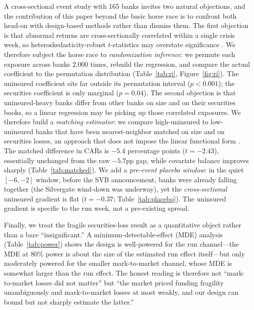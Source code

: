 \documentclass[12pt]{article}
\begin{document}
A cross-sectional event study with 165 banks invites two natural objections, and the
contribution of this paper beyond the basic horse race is to confront both head-on with
design-based methods rather than dismiss them. The first objection is that abnormal returns
are cross-sectionally correlated within a single crisis week, so heteroskedasticity-robust
$t$-statistics may overstate significance \citep{kolari2010,young2019}. We therefore subject
the horse race to \emph{randomization inference}: we permute each exposure across banks
2{,}000 times, rebuild the regression, and compare the actual coefficient to the permutation
distribution (Table~\ref{tab:ri}, Figure~\ref{fig:ri}). The uninsured coefficient sits far
outside its permutation interval ($p<0.001$); the securities coefficient is only marginal
($p=0.04$). The second objection is that uninsured-heavy banks differ from other banks on
size and on their securities books, so a linear regression may be picking up those
correlated exposures. We therefore build a \emph{matching estimator}: we compare
high-uninsured to low-uninsured banks that have been nearest-neighbor matched on size and
on securities losses, an approach that does not impose the linear functional form
\citep{imbens2004}. The matched difference in CARs is $-5.4$ percentage points ($t=-2.43$),
essentially unchanged from the raw $-5.7$pp gap, while covariate balance improves sharply
(Table~\ref{tab:matched}). We add a \emph{pre-event placebo window}: in the quiet
$[-6,-2]$ window, before the SVB announcement, banks were already falling together (the
Silvergate wind-down was underway), yet the \emph{cross-sectional} uninsured gradient is
flat ($t=-0.37$; Table~\ref{tab:placebo}). The uninsured gradient is specific to the run
week, not a pre-existing spread.

Finally, we treat the fragile securities-loss result as a quantitative object rather than a
bare ``insignificant.'' A minimum-detectable-effect (MDE) analysis (Table~\ref{tab:power})
shows the design is well-powered for the run channel---the MDE at 80\% power is about the
size of the estimated run effect itself---but only moderately powered for the smaller
mark-to-market channel, whose MDE is somewhat larger than the run effect. The honest reading
is therefore not ``mark-to-market losses did not matter'' but ``the market priced funding
fragility unambiguously and mark-to-market losses at most weakly, and our design can bound
but not sharply estimate the latter.''
\end{document}
